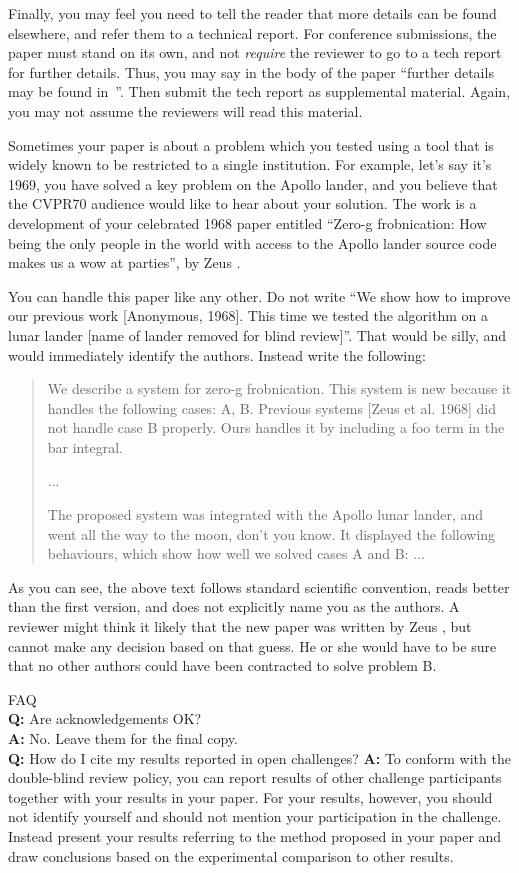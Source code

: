 \documentclass[10pt,twocolumn,letterpaper]{article}
\begin{document}
  Finally, you may feel you need to tell the reader that more details can be found elsewhere, and refer them to a technical report.
  For conference submissions, the paper must stand on its own, and not {\em require} the reviewer to go to a tech report for further details.
  Thus, you may say in the body of the paper ``further details may be found in~\cite{Authors14b}''.
  Then submit the tech report as supplemental material.
  Again, you may not assume the reviewers will read this material.

  Sometimes your paper is about a problem which you tested using a tool that is widely known to be restricted to a single institution.
  For example, let's say it's 1969, you have solved a key problem on the Apollo lander, and you believe that the CVPR70 audience would like to hear about your
  solution.
  The work is a development of your celebrated 1968 paper entitled ``Zero-g frobnication: How being the only people in the world with access to the Apollo lander source code makes us a wow at parties'', by Zeus \etal.

  You can handle this paper like any other.
  Do not write ``We show how to improve our previous work [Anonymous, 1968].
  This time we tested the algorithm on a lunar lander [name of lander removed for blind review]''.
  That would be silly, and would immediately identify the authors.
  Instead write the following:
  \begin{quotation}
  \noindent
    We describe a system for zero-g frobnication.
    This system is new because it handles the following cases:
    A, B.  Previous systems [Zeus et al. 1968] did not  handle case B properly.
    Ours handles it by including a foo term in the bar integral.

    ...

    The proposed system was integrated with the Apollo lunar lander, and went all the way to the moon, don't you know.
    It displayed the following behaviours, which show how well we solved cases A and B: ...
  \end{quotation}
  As you can see, the above text follows standard scientific convention, reads better than the first version, and does not explicitly name you as the authors.
  A reviewer might think it likely that the new paper was written by Zeus \etal, but cannot make any decision based on that guess.
  He or she would have to be sure that no other authors could have been contracted to solve problem B.
  \medskip

  \noindent
  FAQ\medskip\\
  {\bf Q:} Are acknowledgements OK?\\
  {\bf A:} No.  Leave them for the final copy.\medskip\\
  {\bf Q:} How do I cite my results reported in open challenges?
  {\bf A:} To conform with the double-blind review policy, you can report results of other challenge participants together with your results in your paper.
  For your results, however, you should not identify yourself and should not mention your participation in the challenge.
  Instead present your results referring to the method proposed in your paper and draw conclusions based on the experimental comparison to other results.\medskip\\
\end{document}
